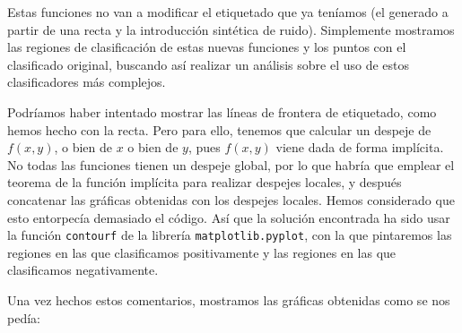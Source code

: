 \documentclass[11pt]{article}
\begin{document}
Estas funciones no van a modificar el etiquetado que ya teníamos (el generado a partir de una recta y la introducción sintética de ruido). Simplemente mostramos las regiones de clasificación de estas nuevas funciones y los puntos con el clasificado original, buscando así realizar un análisis sobre el uso de estos clasificadores más complejos.

Podríamos haber intentado mostrar las líneas de frontera de etiquetado, como hemos hecho con la recta. Pero para ello, tenemos que calcular un despeje de $f(x, y)$, o bien de $x$ o bien de $y$, pues $f(x, y)$ viene dada de forma implícita. No todas las funciones tienen un despeje global, por lo que habría que emplear el teorema de la función implícita para realizar despejes locales, y después concatenar las gráficas obtenidas con los despejes locales. Hemos considerado que esto entorpecía demasiado el código. Así que la solución encontrada ha sido usar la función \lstinline{contourf} de la librería \lstinline{matplotlib.pyplot}, con la que pintaremos las regiones en las que clasificamos positivamente y las regiones en las que clasificamos negativamente.

Una vez hechos estos comentarios, mostramos las gráficas obtenidas como se nos pedía:
\end{document}
